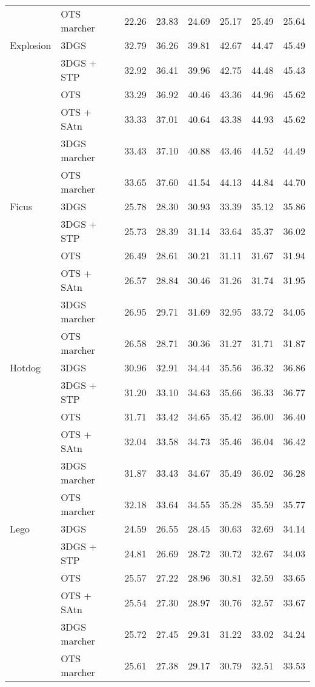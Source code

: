 \begin{longtable}[H]{llrrrrrr}
 & OTS marcher & 22.26 & 23.83 & 24.69 & 25.17 & 25.49 & 25.64 \\
Explosion & 3DGS & 32.79 & 36.26 & 39.81 & 42.67 & 44.47 & 45.49 \\
 & 3DGS + STP & 32.92 & 36.41 & 39.96 & 42.75 & 44.48 & 45.43 \\
 & OTS & 33.29 & 36.92 & 40.46 & 43.36 & 44.96 & 45.62 \\
 & OTS + SAtn & 33.33 & 37.01 & 40.64 & 43.38 & 44.93 & 45.62 \\
 & 3DGS marcher & 33.43 & 37.10 & 40.88 & 43.46 & 44.52 & 44.49 \\
 & OTS marcher & 33.65 & 37.60 & 41.54 & 44.13 & 44.84 & 44.70 \\
Ficus & 3DGS & 25.78 & 28.30 & 30.93 & 33.39 & 35.12 & 35.86 \\
 & 3DGS + STP & 25.73 & 28.39 & 31.14 & 33.64 & 35.37 & 36.02 \\
 & OTS & 26.49 & 28.61 & 30.21 & 31.11 & 31.67 & 31.94 \\
 & OTS + SAtn & 26.57 & 28.84 & 30.46 & 31.26 & 31.74 & 31.95 \\
 & 3DGS marcher & 26.95 & 29.71 & 31.69 & 32.95 & 33.72 & 34.05 \\
 & OTS marcher & 26.58 & 28.71 & 30.36 & 31.27 & 31.71 & 31.87 \\
Hotdog & 3DGS & 30.96 & 32.91 & 34.44 & 35.56 & 36.32 & 36.86 \\
 & 3DGS + STP & 31.20 & 33.10 & 34.63 & 35.66 & 36.33 & 36.77 \\
 & OTS & 31.71 & 33.42 & 34.65 & 35.42 & 36.00 & 36.40 \\
 & OTS + SAtn & 32.04 & 33.58 & 34.73 & 35.46 & 36.04 & 36.42 \\
 & 3DGS marcher & 31.87 & 33.43 & 34.67 & 35.49 & 36.02 & 36.28 \\
 & OTS marcher & 32.18 & 33.64 & 34.55 & 35.28 & 35.59 & 35.77 \\
Lego & 3DGS & 24.59 & 26.55 & 28.45 & 30.63 & 32.69 & 34.14 \\
 & 3DGS + STP & 24.81 & 26.69 & 28.72 & 30.72 & 32.67 & 34.03 \\
 & OTS & 25.57 & 27.22 & 28.96 & 30.81 & 32.59 & 33.65 \\
 & OTS + SAtn & 25.54 & 27.30 & 28.97 & 30.76 & 32.57 & 33.67 \\
 & 3DGS marcher & 25.72 & 27.45 & 29.31 & 31.22 & 33.02 & 34.24 \\
 & OTS marcher & 25.61 & 27.38 & 29.17 & 30.79 & 32.51 & 33.53 \\

\end{longtable}
